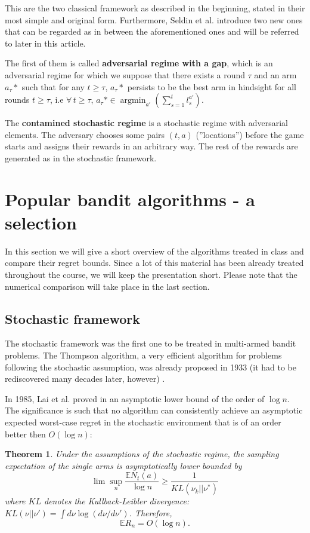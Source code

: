 \documentclass[10.5pt]{article}
\newcommand{\argmin}{\operatorname{arg min}}
\newtheorem{theorem}{Theorem}
\begin{document}
This are the two classical framework as described in the beginning, stated in their most simple and original form. Furthermore, Seldin et al. introduce two new ones that can be regarded as in between the aforementioned ones and will be referred to later in this article.

The first of them is called \textbf{adversarial regime with a gap}, which is an adversarial regime for which we suppose that there exists a round $\tau$ and an arm $a_{\tau}*$ such that for any $t \geq \tau$, $a_{\tau}*$ persists to be the best arm in hindsight for all rounds $t \geq \tau$, i.e $\forall \, t \geq \tau$,  $a_{\tau}* \in \argmin_{a'}(\sum_{s=1}^{t}l_{s}^{a'})$.

The \textbf{contamined stochastic regime} is a stochastic regime with adversarial elements. The adversary chooses some pairs $(t,a)$ (''locations'') before the game starts and assigns their rewards in an arbitrary way. The rest of the rewards are generated as in the stochastic framework.

\section*{Popular bandit algorithms - a selection}

In this section we will give a short overview of the algorithms treated in class and compare their regret bounds. Since a lot of this material has been already treated throughout the course, we will keep the presentation short. Please note that the numerical comparison will take place in the last section.

\subsection*{Stochastic framework}

The stochastic framework was the first one to be treated in multi-armed bandit problems. The Thompson algorithm, a very efficient algorithm for problems following the stochastic assumption, was already proposed in 1933 (it had to be rediscovered many decades later, however) \cite{Thom33}. 

In 1985, Lai et al. proved in \cite{Lai85} an asymptotic lower bound of the order of $\log n$. The significance is such that no algorithm can consistently achieve an asymptotic expected worst-case regret in the stochastic environment that is of an order better then $O(\log n)$:
\begin{theorem}
Under the assumptions of the stochastic regime, the sampling expectation of the single arms is asymptotically lower bounded by
$$ \lim \sup_n \frac{\mathbb{E}N_{t}(a)}{\log n} \geq \frac{1}{KL ( \nu_k || \nu^*)} $$
where $KL$ denotes the Kullback-Leibler divergence: $KL(\nu || \nu') = \int d \nu \log (d \nu / d \nu ' )$. Therefore,
$$ \mathbb{E}R_n = O(\log n).$$
\end{theorem}
\end{document}

